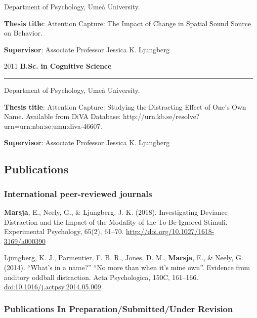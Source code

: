 \documentclass[]{article}
\begin{document}
\begin{changemargin}{2.3cm}{2.4cm}

Department of Psychology, Umeå University.

\textbf{Thesis title}: Attention Capture: The Impact of Change in Spatial Sound Source on Behavior. 
    
\textbf{Supervisor}: Associate Professor Jessica K. Ljungberg
    
\end{changemargin}

2011 \hspace{1.5cm}\textbf{B.Sc. in Cognitive Science} \hrule

\begin{changemargin}{2.3cm}{2.4cm}


Department of Psychology, Umeå University.

\textbf{Thesis title}:  Attention Capture: Studying the Distracting Effect of One’s Own Name. 
Available from DiVA Database: http://urn.kb.se/resolve?urn=urn:nbn:se:umu:diva-46607.
    
\textbf{Supervisor}: Associate Professor Jessica K. Ljungberg

\end{changemargin}

\subsection{Publications}\label{publications}

\subsubsection{International peer-reviewed
journals}\label{international-peer-reviewed-journals}

\textbf{Marsja}, E., Neely, G., \& Ljungberg, J. K. (2018).
Investigating Deviance Distraction and the Impact of the Modality of the
To-Be-Ignored Stimuli. Experimental Psychology, 65(2), 61--70.
\url{http://doi.org/10.1027/1618-3169/a000390}

Ljungberg, K. J., Parmentier, F. B. R., Jones, D. M., \textbf{Marsja},
E., \& Neely, G. (2014). ``What's in a name?'' ``No more than when it's
mine own''. Evidence from auditory oddball distraction. Acta
Psychologica, 150C, 161--166. \url{doi:10.1016/j.actpsy.2014.05.009}.

\subsubsection{Publications In Preparation/Submitted/Under
Revision}\label{publications-in-preparationsubmittedunder-revision}
\end{document}
